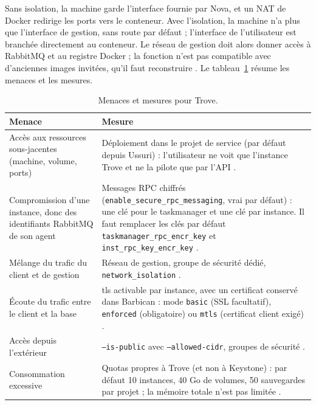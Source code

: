 Sans isolation, la machine garde l'interface fournie par Nova, et un NAT de Docker redirige les ports vers le conteneur. Avec
l'isolation, la machine n'a plus que l'interface de gestion, sans route par défaut ; l'interface de l'utilisateur est branchée
directement au conteneur. Le réseau de gestion doit alors donner accès à RabbitMQ et au registre Docker ; la fonction n'est pas
compatible avec d'anciennes images invitées, qu'il faut reconstruire \parencite{trove-netiso}. Le tableau~\ref{tab:tr-secu} résume les
menaces et les mesures.

\begin{table}[!ht]
\centering
\renewcommand{\arraystretch}{1.3}
\begin{tabular}{@{}>{\raggedright\arraybackslash}p{4.6cm}>{\raggedright\arraybackslash}p{10.9cm}@{}}
\toprule
\textbf{Menace} & \textbf{Mesure} \\
\midrule
Accès aux ressources sous-jacentes (machine, volume, ports) & Déploiement dans le projet de service (par défaut depuis Ussuri) : l'utilisateur ne voit que l'instance Trove et ne la pilote que par l'API \parencite{trove-production}. \\
Compromission d'une instance, donc des identifiants RabbitMQ de son agent & Messages RPC chiffrés (\texttt{enable\_\allowbreak secure\_\allowbreak rpc\_\allowbreak messaging}, vrai par défaut) : une clé pour le taskmanager et une clé par instance. Il faut remplacer les clés par défaut \texttt{taskmanager\_\allowbreak rpc\_\allowbreak encr\_\allowbreak key} et \texttt{inst\_\allowbreak rpc\_\allowbreak key\_\allowbreak encr\_\allowbreak key} \parencite{trove-secure-rpc}. \\
Mélange du trafic du client et de gestion & Réseau de gestion, groupe de sécurité dédié, \texttt{network\_isolation} \parencite{trove-netiso}. \\
Écoute du trafic entre le client et la base & \gls{tls} activable par instance, avec un certificat conservé dans Barbican : mode \texttt{basic} (SSL facultatif), \texttt{enforced} (obligatoire) ou \texttt{mtls} (certificat client exigé) \parencite{trove-ssl}. \\
Accès depuis l'extérieur & \texttt{--is-public} avec \texttt{--allowed-cidr}, groupes de sécurité \parencite{trove-create}. \\
Consommation excessive & Quotas propres à Trove (et non à Keystone) : par défaut 10 instances, 40 Go de volumes, 50 sauvegardes par projet ; la mémoire totale n'est pas limitée \parencite{trove-source}. \\
\bottomrule
\end{tabular}
\caption{Menaces et mesures pour Trove.}
\label{tab:tr-secu}
\end{table}

